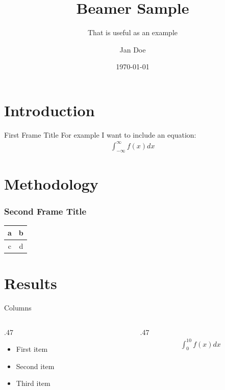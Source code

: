 \documentclass{beamer}
\title{Beamer Sample}
\subtitle{That is useful as an example}
\institute{University of East}
\author{Jan Doe }
\date{\today}
\begin{document}
\maketitle
\section{Introduction}
\begin{frame}{First Frame Title}
    For example I want to include an equation:
    \begin{align*}
       \int_{-\infty}^{\infty} f(x) dx        
    \end{align*}
\end{frame}

\section{Methodology}
\begin{frame}
    \frametitle{Second Frame Title}
    \begin{center}
        \begin{tabular}{cc}
            a & b \\
            \hline
            c & d
        \end{tabular}
    \end{center}  
\end{frame}

\section{Results}
\begin{frame}{Columns}
  \begin{columns}
    \begin{column}{.47\textwidth}
        \begin{itemize}
            \item First item
            \item Second item
            \item Third item
        \end{itemize}        
    \end{column}
    \begin{column}{.47\textwidth}
        \begin{align*}
       \int_{0}^{10} f(x) dx
        \end{align*}
    \end{column}      
  \end{columns}   
\end{frame}
\end{document}
